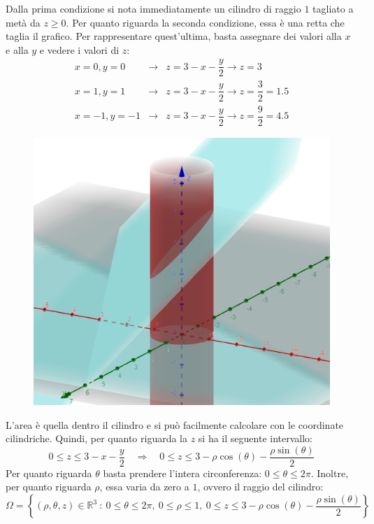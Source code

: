 \documentclass[a4paper]{article}
\begin{document}
	\noindent
	Dalla prima condizione si nota immediatamente un cilindro di raggio $1$ tagliato a metà da $z \ge 0$. Per quanto riguarda la seconda condizione, essa è una retta che taglia il grafico. Per rappresentare quest'ultima, basta assegnare dei valori alla $x$ e alla $y$ e vedere i valori di $z$:
	\begin{equation*}
		\begin{array}{rcl}
			x=0,y=0 & \rightarrow & z = 3 - x - \dfrac{y}{2} \rightarrow z = 3 \\ [.8em]
			x=1,y=1 & \rightarrow & z = 3 - x - \dfrac{y}{2} \rightarrow z = \dfrac{3}{2} = 1.5 \\ [.8em]
			x=-1,y=-1 & \rightarrow & z = 3 - x - \dfrac{y}{2} \rightarrow z = \dfrac{9}{2} = 4.5
		\end{array}
	\end{equation*}
	\begin{figure}[!htp]
		\centering
		\includegraphics[width=.7\textwidth]{img/exercise/2023-07-10-A-ex7.png}
	\end{figure}

	\noindent
	L'area è quella dentro il cilindro e si può facilmente calcolare con le coordinate cilindriche. Quindi, per quanto riguarda la $z$ si ha il seguente intervallo:
	\begin{equation*}
		0 \le z \le 3-x-\dfrac{y}{2} \hspace{1em} \Rightarrow \hspace{1em} 0 \le z \le 3 - \rho\cos\left(\theta\right) - \dfrac{\rho\sin\left(\theta\right)}{2}
	\end{equation*}
	Per quanto riguarda $\theta$ basta prendere l'intera circonferenza: $0 \le \theta \le 2\pi$. Inoltre, per quanto riguarda $\rho$, essa varia da zero a $1$, ovvero il raggio del cilindro:
	\begin{equation*}
		\Omega = \left\{\left(\rho,\theta, z\right) \in \mathbb{R}^{3} \: : \: 0 \le \theta \le 2\pi, \: 0 \le \rho \le 1, \: 0 \le z \le 3 - \rho\cos\left(\theta\right) - \dfrac{\rho\sin\left(\theta\right)}{2}\right\}
	\end{equation*}\newpage
\end{document}
